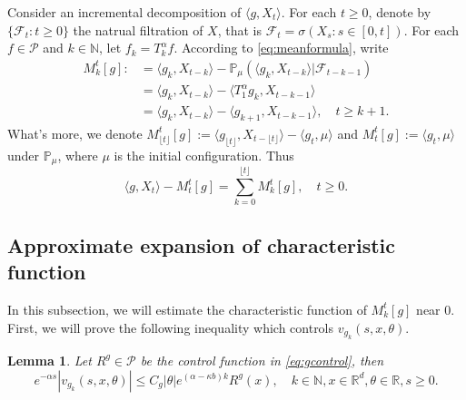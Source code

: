 \documentclass[12pt, a4paper]{amsart}
\newtheorem{lem}[thm]{Lemma}
\theoremstyle{definition}
\numberwithin{equation}{section}
\begin{document}
Consider an incremental decomposition of $\langle g,X_t \rangle$.
    For each $t\geq 0$, denote by $\{\mathcal{F}_t:t\geq 0\}$ the natrual filtration of $X$, that is $\mathcal{F}_t=\sigma(X_s:s\in [0,t])$.
    For each $f\in\mathcal{P}$ and $k \in \mathbb{N}$, let $f_k=T^{\alpha}_k f$.
    According to \eqref{eq:meanformula}, write
\begin{align*}
    M_k^t[g]:&=\langle g_k, X_{t-k}\rangle-\mathbb{P}_{\mu}(\langle g_k,X_{t-k}\rangle|\mathcal{F}_{t-k-1})\\
    &=\langle g_k, X_{t-k}\rangle-\langle T_1^{\alpha}g_{k},X_{t-k-1}\rangle\\
    &=\langle g_k, X_{t-k}\rangle-\langle g_{k+1},X_{t-k-1}\rangle, \quad t\geq k+1.
\end{align*}
    What's more, we denote $M_{\lfloor t\rfloor}^t[g]:=\langle g_{\lfloor t \rfloor},X_{t-\lfloor t\rfloor}\rangle-\langle g_t, \mu\rangle$ and $M_t^t[g]:=\langle g_t,\mu\rangle$ under $\mathbb P_\mu$, where $\mu $ is the initial configuration. Thus
\begin{equation}\label{decomposition}
    \langle g,X_t\rangle-M_t^t[g]
    =\sum_{k=0}^{\lfloor t\rfloor}M_k^t[g]
    , \quad t \geq 0.
\end{equation}

\subsection{Approximate expansion of characteristic function}

In this subsection, we will estimate the characteristic function of $M_k^t[g]$ near $0$. First, we will prove the following inequality which controls $v_{g_k}(s,x,\theta)$.
\begin{lem}\label{lemma1}
    Let $R^g \in \mathcal P$ be the control function in \eqref{eq:gcontrol}, then
\begin{equation}
    e^{-\alpha s}|v_{g_k}(s,x,\theta)|
    \leq C_g|\theta|e^{(\alpha-\kappa b)k} R^g(x),
    \quad k\in \mathbb N, x\in \mathbb R^d, \theta \in \mathbb R, s\geq 0.
\end{equation}
\end{lem}
\end{document}
